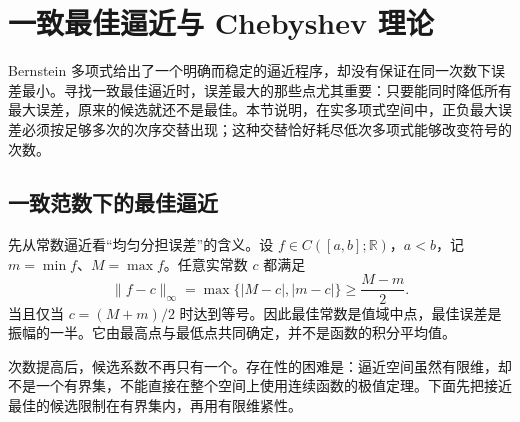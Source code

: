 \section{一致最佳逼近与 Chebyshev 理论}
\label{b2:sec:approximation-chebyshev}
\label{b2:sec:0208}

Bernstein 多项式给出了一个明确而稳定的逼近程序，却没有保证在同一次数下误差最小。寻找一致最佳逼近时，误差最大的那些点尤其重要：只要能同时降低所有最大误差，原来的候选就还不是最佳。本节说明，在实多项式空间中，正负最大误差必须按足够多次的次序交替出现；这种交替恰好耗尽低次多项式能够改变符号的次数。

\subsection{一致范数下的最佳逼近}
\label{b2:subsec:020801}

先从常数逼近看“均匀分担误差”的含义。设 \(f\in C([a,b];\mathbb R)\)，\(a<b\)，记 \(m=\min f\)、\(M=\max f\)。任意实常数 \(c\) 都满足
\[
 \lVert f-c\rVert_\infty=\max\{|M-c|,|m-c|\}
 \geq\frac{M-m}{2}.
\]
当且仅当 \(c=(M+m)/2\) 时达到等号。因此最佳常数是值域中点，最佳误差是振幅的一半。它由最高点与最低点共同确定，并不是函数的积分平均值。

\ProseParagraphBreak
次数提高后，候选系数不再只有一个。存在性的困难是：逼近空间虽然有限维，却不是一个有界集，不能直接在整个空间上使用连续函数的极值定理。下面先把接近最佳的候选限制在有界集内，再用有限维紧性。

